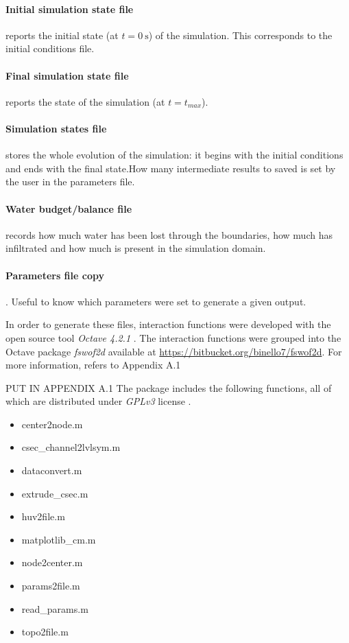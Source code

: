 \paragraph{Initial simulation state file} reports the initial state (at $t = \SI{0}{\s}$) of the simulation. 
This corresponds to the initial conditions file.
\paragraph{Final simulation state file} reports the state of the simulation (at $t = t_{max}$).
\paragraph{Simulation states file} stores the whole evolution of the simulation: it begins with the initial conditions and ends with the final state.How many intermediate results to saved is set by the user in the parameters file.
\paragraph{Water budget/balance file} records how much water has been lost through the boundaries, how much has infiltrated and how much is present in the simulation domain.
\paragraph{Parameters file copy}. Useful to know which parameters were set to generate a given output.

In order to generate these files, interaction functions were developed with the open source tool \textit{Octave 4.2.1} \autocite{octave_community_gnu_2018}. The interaction functions were grouped into the Octave package \textit{fswof2d} available at \url{https://bitbucket.org/binello7/fswof2d}. For more information, refers to  Appendix A.1


PUT IN APPENDIX A.1 
The package includes the following functions, all of which are distributed under \textit {GPLv3} license \autocite{smith_quick_2014}.
 
\begin{itemize}
\itemsep0em
  \item center2node.m
  \item csec\_channel2lvlsym.m
  \item dataconvert.m
  \item extrude\_csec.m
  \item huv2file.m
  \item matplotlib\_cm.m
  \item node2center.m
  \item params2file.m
  \item read\_params.m
  \item topo2file.m
\end{itemize}









